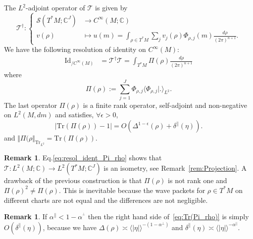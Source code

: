 \documentclass[10pt]{amsart}
\theoremstyle{definition}\newtheorem{defi}[theo]{Definition}\newtheorem{rema}[theo]{Remark}\newtheorem{exam}[theo]{Example}\newtheorem{exem}[theo]{Example}\newtheorem{nota}[theo]{Notation}
\newcommand{\clS}{\mathcal{S}}
\newcommand{\clT}{\mathcal{T}}
\newcommand{\Id}{\mathrm{Id}}
\newcommand{\Tr}{\mathrm{Tr}}
\newcommand{\bbC}{\mathbb{C}}
\let\oldforall\forall
\renewcommand*{\forall}{\mathrel{\oldforall}}
\begin{document}
\begin{cBoxB}{}
\begin{prop}\label{prop:resolution_identity_CM}
The $L^{2}$-adjoint operator of $\clT$ is given by
\begin{equation}\label{eq:def_T_*}
\clT^{\dagger}:
\begin{cases}
\clS\left(T^{*}M;\bbC^{J}\right) & \rightarrow C^{\infty}\left(M;\bbC\right)\\
v\left(\rho\right) & \mapsto u\left(m\right)=\int_{\rho\in T^{*}M}\sum_{j}v_{j}\left(\rho\right)\Phi_{\rho,j}\left(m\right)\frac{d\rho}{\left(2\pi\right)^{n+1}}.
\end{cases}
\end{equation}
We have the following resolution of identity on $C^{\infty}\left(M\right)$:
\begin{align}\label{eq:resol_ident_Pi_rho}
\Id _{/C^{\infty}\left(M\right)} & =\clT^{\dagger}\clT=\int_{T^{*}M}\Pi\left(\rho\right)\frac{d\rho}{\left(2\pi\right)^{n+1}}
\end{align}
where
\begin{equation}\label{eq:Pi_(rho)}
\Pi\left(\rho\right):=\sum_{j=1}^{J}\Phi_{\rho,j}\langle\Phi_{\rho,j}|.\rangle_{L^{2}}.
\end{equation}
The last operator $\Pi(\rho)$ is a finite rank operator, self-adjoint and non-negative on $L^{2}(M,dm)$ and satisfies, $\forall\epsilon>0$,
\begin{equation}\label{eq:Tr(Pi_rho)}
\left|\Tr\left(\Pi\left(\rho\right)\right)-1\right|=O\left(\Delta^{1-\epsilon}\left(\rho\right)+\delta^{\parallel}\left(\eta\right)\right).
\end{equation}
and $\Vert \Pi(\rho\Vert _{\Tr_{L^{2}}}=\Tr(\Pi(\rho))$.
\end{prop}
\end{cBoxB}

\begin{rema}
Eq.\eqref{eq:resol_ident_Pi_rho} shows that $\clT:L^{2}(M;\bbC)\rightarrow L^{2}(T^{*}M;\bbC^{J})$ is an isometry, see Remark~\ref{rem:Projection}. A drawback of the previous construction is that $\Pi(\rho)$ is not rank one and $\Pi(\rho)^{2}\neq\Pi(\rho)$. This is inevitable because the wave packets for $\rho\in T^{*}M$ on different charts are not equal and the differences are not negligible.
\end{rema}


\begin{rema}
If $\alpha^{\parallel}<1-\alpha^{^{\perp}}$ then the right hand side of~\eqref{eq:Tr(Pi_rho)} is simply $O(\delta^{\parallel}(\eta))$, because we have $\Delta(\rho)\asymp\langle |\eta|\rangle^{-(1-\alpha^{\perp})}$ and $\delta^{\parallel}(\eta)\asymp\langle |\eta|\rangle ^{-\alpha^{\parallel}}$.
\end{rema}
\end{document}
